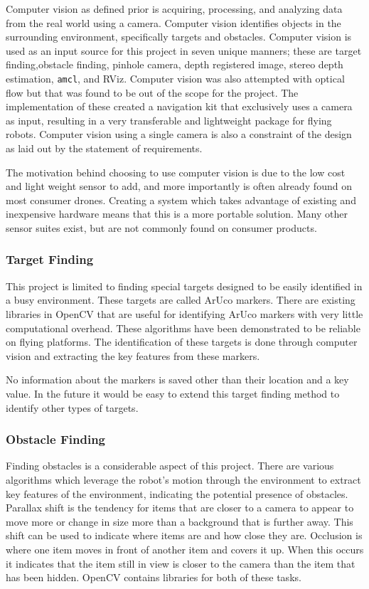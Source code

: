 \documentclass{article}[12]
\begin{document}
	Computer vision as defined prior is acquiring, processing, and analyzing data from the real world using a camera. Computer vision identifies objects in the surrounding environment, specifically targets and obstacles. Computer vision is used as an input source for this project in seven unique manners; these are target finding,obstacle finding, pinhole camera, depth registered image, stereo depth estimation, \texttt{amcl}, and RViz. Computer vision was also attempted with optical flow but that was found to be out of the scope for the project. The implementation of these created a navigation kit that exclusively uses a camera as input, resulting in a very transferable and lightweight package for flying robots. Computer vision using a single camera is also a constraint of the design as laid out by the statement of requirements. \cite{sor}
	
	The motivation behind choosing to use computer vision is due to the low cost and light weight sensor to add, and more importantly is often already found on most consumer drones. Creating a system which takes advantage of existing and inexpensive hardware means that this is a more portable solution. Many other sensor suites exist, but are not commonly found on consumer products.

		\subsubsection{Target Finding}
		
		This project is limited to finding special targets designed to be easily identified in a busy environment. These targets are called ArUco markers. There are existing libraries in OpenCV that are useful for identifying ArUco markers with very little computational overhead. These algorithms have been demonstrated to be reliable on flying platforms. \cite{bacik2017autonomous} The identification of these targets is done through computer vision and extracting the key features from these markers. 
		
		No information about the markers is saved other than their location and a key value. In the future it would be easy to extend this target finding method to identify other types of targets.
		
		\subsubsection{Obstacle Finding}
		
		Finding obstacles is a considerable aspect of this project. There are various algorithms which leverage the robot's motion through the environment to extract key features of the environment, indicating the potential presence of obstacles. Parallax shift is the tendency for items that are closer to a camera to appear to move more or change in size more than a background that is further away. This shift can be used to indicate where items are and how close they are. Occlusion is where one item moves in front of another item and covers it up. When this occurs it indicates that the item still in view is closer to the camera than the item that has been hidden. OpenCV contains libraries for both of these tasks.
		
\end{document}
